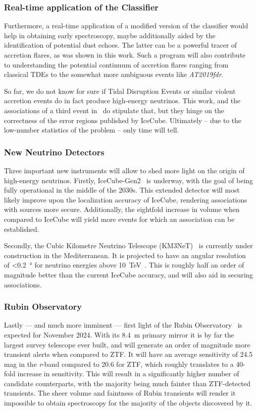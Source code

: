 \subsubsection{Real-time application of the Classifier}
Furthermore, a real-time application of a modified version of the classifier would help in obtaining early spectroscopy, maybe additionally aided by the identification of potential dust echoes. The latter can be a powerful tracer of accretion flares, as was shown in this work. Such a program will also contribute to understanding the potential continuum of accretion flares ranging from classical TDEs to the somewhat more ambiguous events like \textit{AT2019fdr}.

So far, we do not know for sure if Tidal Disruption Events or similar violent accretion events do in fact produce high-energy neutrinos. This work, and the associations of a third event in~\cite{Velzen2021} do stipulate that, but they hinge on the correctness of the error regions published by IceCube. Ultimately -- due to the low-number statistics of the problem -- only time will tell.

\subsubsection{New Neutrino Detectors}
Three important new instruments will allow to shed more light on the origin of high-energy neutrinos. Firstly, IceCube-Gen2~ is underway, with the goal of being fully operational in the middle of the 2030s. This extended detector will most likely improve upon the localization accuracy of IceCube, rendering associations with sources more secure. Additionally, the eightfold increase in volume when compared to IceCube will yield more events for which an association can be established.

Secondly, the Cubic Kilometre Neutrino Telescope (KM3NeT)~ is currently under construction in the Mediterranean. It is projected to have an angular resolution of \SI{<0.2}{\degree} for neutrino energies above \SI{10}{\tera\eV}~. This is roughly half an order of magnitude better than the current IceCube accuracy, and will also aid in securing associations.

\subsubsection{Rubin Observatory}
Lastly --- and much more imminent --- first light of the Rubin Observatory~\cite{Ivezic2019} is expected for November 2024. With its \SI{8.4}{\m} primary mirror it is by far the largest survey telescope ever built, and will generate an order of magnitude more transient alerts when compared to ZTF. It will have an average sensitivity of 24.5 mag in the \textit{r}-band compared to 20.6 for ZTF, which roughly translates to a 40-fold increase in sensitivity. This will result in a significantly higher number of candidate counterparts, with the majority being much fainter than ZTF-detected transients. The sheer volume and faintness of Rubin transients will render it impossible to obtain spectroscopy for the majority of the objects discovered by it.

